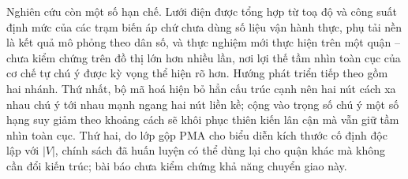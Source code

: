 \documentclass[10pt, conference, a4paper, compsocconf]{IEEEtran}
\begin{document}
Nghiên cứu còn một số hạn chế. Lưới điện được tổng hợp từ toạ độ và công suất
định mức của các trạm biến áp chứ chưa dùng số liệu vận hành thực, phụ tải nền
là kết quả mô phỏng theo dân số, và thực nghiệm mới thực hiện trên một quận --
chưa kiểm chứng trên đồ thị lớn hơn nhiều lần, nơi lợi thế tầm nhìn toàn cục
của cơ chế tự chú ý được kỳ vọng thể hiện rõ hơn. Hướng phát triển tiếp theo gồm hai
nhánh. Thứ nhất, bộ mã hoá hiện bỏ hẳn cấu trúc cạnh nên hai nút cách xa nhau
chú ý tới nhau mạnh ngang hai nút liền kề; cộng vào trọng số chú ý một số hạng
suy giảm theo khoảng cách sẽ khôi phục thiên kiến lân cận mà vẫn giữ tầm nhìn
toàn cục. Thứ hai, do lớp gộp PMA cho biểu diễn kích thước cố định độc lập với
$|V|$, chính sách đã huấn luyện có thể dùng lại cho quận khác mà không cần đổi
kiến trúc; bài báo chưa kiểm chứng khả năng chuyển giao này.



\end{document}
